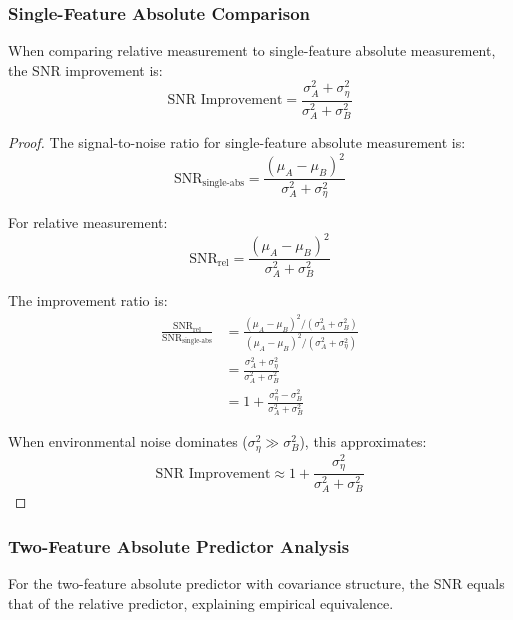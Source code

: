 \subsubsection{Single-Feature Absolute Comparison}

\begin{theorem}
\label{thm:single_feature_snr}
When comparing relative measurement to single-feature absolute measurement, the SNR improvement is:
\begin{equation}
\text{SNR Improvement} = \frac{\sigma_A^2 + \sigma_\eta^2}{\sigma_A^2 + \sigma_B^2}
\end{equation}
\end{theorem}

\begin{proof}
The signal-to-noise ratio for single-feature absolute measurement is:
\begin{equation}
\text{SNR}_{\text{single-abs}} = \frac{(\mu_A - \mu_B)^2}{\sigma_A^2 + \sigma_\eta^2}
\end{equation}

For relative measurement:
\begin{equation}
\text{SNR}_{\text{rel}} = \frac{(\mu_A - \mu_B)^2}{\sigma_A^2 + \sigma_B^2}
\end{equation}

The improvement ratio is:
\begin{align}
\frac{\text{SNR}_{\text{rel}}}{\text{SNR}_{\text{single-abs}}} &= \frac{(\mu_A - \mu_B)^2/(\sigma_A^2 + \sigma_B^2)}{(\mu_A - \mu_B)^2/(\sigma_A^2 + \sigma_\eta^2)} \nonumber\\
&= \frac{\sigma_A^2 + \sigma_\eta^2}{\sigma_A^2 + \sigma_B^2} \nonumber\\
&= 1 + \frac{\sigma_\eta^2 - \sigma_B^2}{\sigma_A^2 + \sigma_B^2}
\end{align}

When environmental noise dominates ($\sigma_\eta^2 \gg \sigma_B^2$), this approximates:
\begin{equation}
\text{SNR Improvement} \approx 1 + \frac{\sigma_\eta^2}{\sigma_A^2 + \sigma_B^2}
\end{equation}
\end{proof}

\subsubsection{Two-Feature Absolute Predictor Analysis}

\begin{theorem}
\label{thm:two_feature_equivalence}
For the two-feature absolute predictor with covariance structure, the SNR equals that of the relative predictor, explaining empirical equivalence.
\end{theorem}

